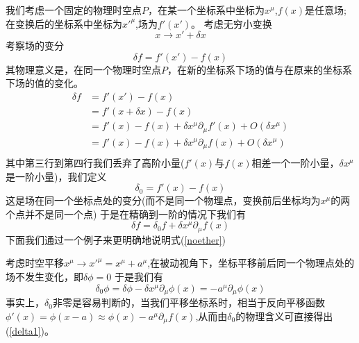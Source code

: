 我们考虑一个固定的物理时空点$P$，在某一个坐标系中坐标为$x^{\mu}$,$f(x)$是任意场;在变换后的坐标系中坐标为$x'^{\mu}$,场为$f'(x')$。
考虑无穷小变换
\begin{equation}
    x\rightarrow x'+\delta x
\end{equation}
考察场的变分
\begin{equation}
    \delta f=f'(x')-f(x)
\end{equation}
其物理意义是，在同一个物理时空点$P$，在新的坐标系下场的值与在原来的坐标系下场的值的变化。
\begin{equation}
\begin{aligned}
    \delta f&=f'(x')-f(x)\\
    &=f'(x+\delta x)-f(x)\\
    &=f'(x)-f(x)+\delta x^{\mu}\partial_{\mu}f'(x)+O(\delta x^{\mu})\\
    &=f'(x)-f(x)+\delta x^{\mu}\partial_{\mu}f(x)+O(\delta x^{\mu})\\
    \end{aligned}
\end{equation}
其中第三行到第四行我们丢弃了高阶小量($f'(x)$与$f(x)$相差一个一阶小量，$\delta x^{\mu}$是一阶小量)，我们定义
\begin{equation}
    \delta_{0}=f'(x)-f(x)
\end{equation}
这是场在同一个坐标点处的变分(而不是同一个物理点，变换前后坐标均为$x^{\mu}$的两个点并不是同一个点)
于是在精确到一阶的情况下我们有
\begin{equation}
\label{noether}
    \delta f=\delta_{0}f+\delta x^{\mu}\partial_{\mu}f(x)
\end{equation}
下面我们通过一个例子来更明确地说明式(\ref{noether})

考虑时空平移$x^{\mu}\rightarrow x'^{\mu}=x^{\mu}+a^{\mu}$,在被动视角下，坐标平移前后同一个物理点处的场不发生变化，即$\delta \phi=0$
于是我们有
\begin{equation}
\label{delta1}
    \delta_{0}\phi=\delta \phi-\delta x^{\mu}\partial_{\mu}\phi(x)=-a^{\mu}\partial_{\mu}\phi(x)
\end{equation}
事实上，$\delta_{0}$非零是容易判断的，当我们平移坐标系时，相当于反向平移函数$\phi'(x)=\phi(x-a)\approx \phi(x)-a^{\mu}\partial_{\mu}f(x)$,从而由$\delta_{0}$的物理含义可直接得出(\ref{delta1})。

